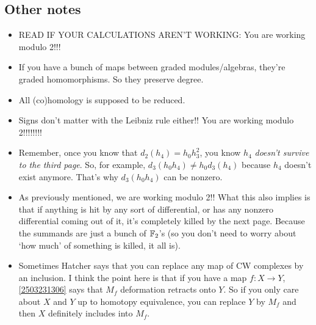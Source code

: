 \documentclass{MetricNotes2023}
\def\bb{\ensuremath\mathbb}
\def\A{\ensuremath{\mathscr{A}_2}}
\begin{document}
\subsection{Other notes}\label{2503231313}

\begin{itemize}
\item READ IF YOUR CALCULATIONS AREN'T WORKING: You are working modulo 2!!!

\item If you have a bunch of maps between graded modules/algebras, they're graded homomorphisms. So they preserve degree. 

\item All (co)homology is supposed to be reduced.
\item Signs don't matter with the Leibniz rule either!! You are working modulo 2!!!!!!!!

\item Remember, once you know that \(d_2(h_4)=h_0h_3^2\), you know \(h_4\) \textit{doesn't survive to the third page}. So, for example, \(d_3(h_0h_4)\neq h_0d_3(h_4)\) because \(h_4\) doesn't exist anymore. That's why \(d_3(h_0h_4)\) can be nonzero. 

\item As previously mentioned, we are working modulo 2!! What this also implies is that if anything is hit by any sort of differential, or has any nonzero differential coming out of it, it's completely killed by the next page. Because the summands are just a bunch of \(\bb{F}_2\)'s (so you don't need to worry about `how much' of something is killed, it all is). 

\item Sometimes Hatcher says that you can replace any map of CW complexes by an inclusion. I think the point here is that if you have a map \(f : X \to Y\), \ref{2503231306} says that \(M_f\) deformation retracts onto \(Y\). So if you only care about \(X\) and \(Y\) up to homotopy equivalence, you can replace \(Y\) by \(M_f\) and then \(X\) definitely includes into \(M_f\). 


\end{itemize}
\end{document}
